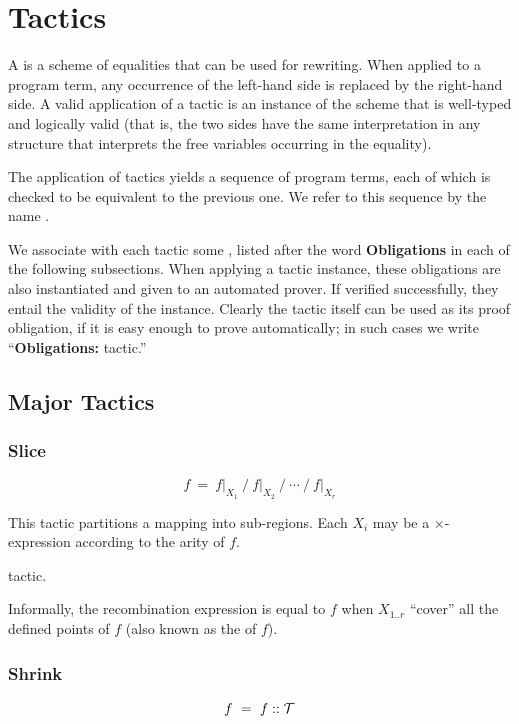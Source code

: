 \section{Tactics}

A  is a scheme of equalities that can be used for rewriting.
When applied to a program term, any occurrence of the left-hand side is replaced by the right-hand side.
A valid application of a tactic is an instance of the scheme that is well-typed and logically valid
(that is, the two sides have the same interpretation in any structure that interprets the free
variables occurring in the equality).

The application of tactics yields a sequence of program terms, each of which is checked to
be equivalent to the previous one. We refer to this sequence by the name .

We associate with each tactic some , listed after the word {\bf Obligations}
in each of the following subsections.
When applying a tactic instance,
these obligations are also instantiated and given to an automated prover. If verified successfully,
they entail the validity of the instance. Clearly the tactic itself can be used as its proof obligation,
if it is easy enough to prove automatically; in such cases we write ``{\bf Obligations:} tactic.''

\newcommand\Obligations{\medskip\noindent{\bf Obligations:} }
\newcommand\reduce{\operatorname{reduce}}
\newcommand\listConcat{{\scriptstyle \,++\,}}

\subsection{Major Tactics}

\subsubsection{Slice} \label{tactics:Slice}
\[f ~=~ f\big|_{X_1} ~\Big/~ f\big|_{X_2} ~\Big/ ~\cdots~ \Big/~ f\big|_{X_r}\]

This tactic partitions a mapping into sub-regions. Each $X_i$ may be a $\times$-expression
according to the arity of $f$.

\Obligations tactic.

Informally, the recombination expression is equal to $f$
when $X_{1..r}$ ``cover'' all the defined points of $f$ (also known as the  of $f$).

\subsubsection{Shrink} \label{tactics:Shrink}
\[f ~=~ f :: \mathcal{T}\]

